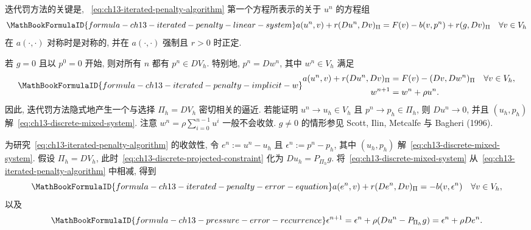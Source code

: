 迭代罚方法的关键是, ~\eqref{eq:ch13-iterated-penalty-algorithm} 第一个方程所表示的关于 $u^n$ 的方程组
\[
\MathBookFormulaID{formula-ch13-iterated-penalty-linear-system}
a(u^n,v)+r(Du^n,Dv)_\Pi
=F(v)-b(v,p^n)+r(g,Dv)_\Pi
\quad\forall v\in V_h
\]
在 $a(\cdot,\cdot)$ 对称时是对称的, 并在 $a(\cdot,\cdot)$ 强制且 $r>0$ 时正定.

若 $g=0$ 且以 $p^0=0$ 开始, 则对所有 $n$ 都有 $p^n\in DV_h$. 特别地, $p^n=Dw^n$, 其中 $w^n\in V_h$ 满足
\[
\MathBookFormulaID{formula-ch13-iterated-penalty-implicit-w}
\begin{aligned}
a(u^n,v)+r(Du^n,Dv)_\Pi
&=F(v)-(Dv,Dw^n)_\Pi&&\forall v\in V_h,\\
w^{n+1}&=w^n+\rho u^n.
\end{aligned}
\]
因此, 迭代罚方法隐式地产生一个与选择 $\Pi_h=DV_h$ 密切相关的逼近. 若能证明 $u^n\to u_h\in V_h$ 且 $p^n\to p_h\in\Pi_h$, 则 $Du^n\to0$, 并且 $(u_h,p_h)$ 解~\eqref{eq:ch13-discrete-mixed-system}. 注意 $w^n=\rho\sum_{i=0}^{n-1}u^i$ 一般不会收敛. $g\neq0$ 的情形参见 Scott, Ilin, Metcalfe 与 Bagheri (1996).

为研究~\eqref{eq:ch13-iterated-penalty-algorithm} 的收敛性, 令 $e^n:=u^n-u_h$ 且 $\epsilon^n:=p^n-p_h$, 其中 $(u_h,p_h)$ 解~\eqref{eq:ch13-discrete-mixed-system}. 假设 $\Pi_h=DV_h$, 此时~\eqref{eq:ch13-discrete-projected-constraint} 化为 $Du_h=P_{\Pi_h}g$. 将~\eqref{eq:ch13-discrete-mixed-system} 从~\eqref{eq:ch13-iterated-penalty-algorithm} 中相减, 得到
\begin{equation}
\MathBookFormulaID{formula-ch13-iterated-penalty-error-equation}
\label{eq:ch13-iterated-penalty-error-equation}
a(e^n,v)+r(De^n,Dv)_\Pi=-b(v,\epsilon^n)
\quad\forall v\in V_h,
\end{equation}
以及
\begin{equation}
\MathBookFormulaID{formula-ch13-pressure-error-recurrence}
\label{eq:ch13-pressure-error-recurrence}
\epsilon^{n+1}=\epsilon^n+\rho(Du^n-P_{\Pi_h}g)
=\epsilon^n+\rho De^n.
\end{equation}

